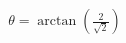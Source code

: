 \documentclass[preview]{standalone}
\begin{document}
\begin{align*}
\theta = \arctan\left(\frac{2}{\sqrt{2}}\right)
\end{align*}
\end{document}
